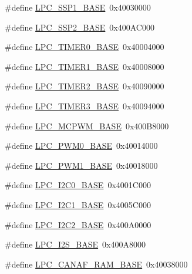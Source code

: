 \begin{DoxyCompactItemize}
\item 
\#define \hyperlink{group__PERIPH__407X__8X__BASE_ga05d118997f53f596d3a087f8b91a1969}{L\-P\-C\-\_\-\-S\-S\-P1\-\_\-\-B\-A\-S\-E}~0x40030000
\item 
\#define \hyperlink{group__PERIPH__407X__8X__BASE_ga1460d4b0a86fa00b3d3ef8abd21abbc1}{L\-P\-C\-\_\-\-S\-S\-P2\-\_\-\-B\-A\-S\-E}~0x400\-A\-C000
\item 
\#define \hyperlink{group__PERIPH__407X__8X__BASE_ga58d2cc2a6a4bd9319853ad5b62a20d43}{L\-P\-C\-\_\-\-T\-I\-M\-E\-R0\-\_\-\-B\-A\-S\-E}~0x40004000
\item 
\#define \hyperlink{group__PERIPH__407X__8X__BASE_ga077e94a95d95d79f6aeb0ea962377c46}{L\-P\-C\-\_\-\-T\-I\-M\-E\-R1\-\_\-\-B\-A\-S\-E}~0x40008000
\item 
\#define \hyperlink{group__PERIPH__407X__8X__BASE_gab46122134a159b494e060ae3a7be0967}{L\-P\-C\-\_\-\-T\-I\-M\-E\-R2\-\_\-\-B\-A\-S\-E}~0x40090000
\item 
\#define \hyperlink{group__PERIPH__407X__8X__BASE_ga002e95d51eef32473052ea2575440eac}{L\-P\-C\-\_\-\-T\-I\-M\-E\-R3\-\_\-\-B\-A\-S\-E}~0x40094000
\item 
\#define \hyperlink{group__PERIPH__407X__8X__BASE_gad8a41dc802e3ea0ba9457d42a6927c03}{L\-P\-C\-\_\-\-M\-C\-P\-W\-M\-\_\-\-B\-A\-S\-E}~0x400\-B8000
\item 
\#define \hyperlink{group__PERIPH__407X__8X__BASE_gad2e9bbd8d91b559eed11b8e83bd73bbf}{L\-P\-C\-\_\-\-P\-W\-M0\-\_\-\-B\-A\-S\-E}~0x40014000
\item 
\#define \hyperlink{group__PERIPH__407X__8X__BASE_gabb885bd92b4a003b94dc27c4700818bb}{L\-P\-C\-\_\-\-P\-W\-M1\-\_\-\-B\-A\-S\-E}~0x40018000
\item 
\#define \hyperlink{group__PERIPH__407X__8X__BASE_gab4476c9e874621194369f74fcf26ce92}{L\-P\-C\-\_\-\-I2\-C0\-\_\-\-B\-A\-S\-E}~0x4001\-C000
\item 
\#define \hyperlink{group__PERIPH__407X__8X__BASE_gae59f73cf24ff126be3b9a8b921926676}{L\-P\-C\-\_\-\-I2\-C1\-\_\-\-B\-A\-S\-E}~0x4005\-C000
\item 
\#define \hyperlink{group__PERIPH__407X__8X__BASE_ga00796bd1f1fa200bbffcd9e7e8679eaa}{L\-P\-C\-\_\-\-I2\-C2\-\_\-\-B\-A\-S\-E}~0x400\-A0000
\item 
\#define \hyperlink{group__PERIPH__407X__8X__BASE_gacff8b54e3924910d381e6b8ba804050c}{L\-P\-C\-\_\-\-I2\-S\-\_\-\-B\-A\-S\-E}~0x400\-A8000
\item 
\#define \hyperlink{group__PERIPH__407X__8X__BASE_ga9d4f2bac61e26b32ad64d62f2be50e49}{L\-P\-C\-\_\-\-C\-A\-N\-A\-F\-\_\-\-R\-A\-M\-\_\-\-B\-A\-S\-E}~0x40038000

\end{DoxyCompactItemize}
